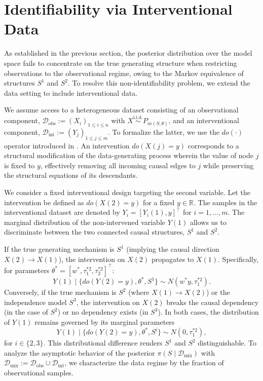 \documentclass[accepted]{uai2026} %
\newcommand{\train}{\mathcal{D}}
\newcommand{\obsdata}{\train_{\text{obs}}}
\newcommand{\mixdata}{\train_{\text{mix}}}
\newcommand{\tsone}{\tau_1^{*2}}
\newcommand{\tstwo}{\tau_2^{*2}}
\newcommand{\intdata}{\train_{\text{int}}}
\def\transpose{\intercal}
\theoremstyle{boldremark}
\begin{document}
\section{Identifiability via Interventional Data}
\label{sec:ident}
As established in the previous section, the posterior distribution over the model space fails to concentrate on the true generating structure when restricting observations to the observational regime, owing to the Markov equivalence of structures $S^1$ and $S^2$. To resolve this non-identifiability problem, we extend the data setting to include interventional data.

We assume access to a heterogeneous dataset consisting of an observational component, $\obsdata := (X_i)_{1\leq i \leq n} $ with $X\stackrel{\text{i.i.d.}}{\sim} P_{m(S,\theta)}$, and an interventional component, $\intdata := (Y_j)_{1\leq j \leq m}$. To formalize the latter, we use the $do(\cdot)$ operator introduced in \cite{pearl2009causality}. An intervention $do(X(j) = y)$ corresponds to a structural modification of the data-generating process wherein the value of node $j$ is fixed to $y$, effectively removing all incoming causal edges to $j$ while preserving the structural equations of its descendants.

We consider a fixed interventional design targeting the second variable. Let the intervention be defined as $do(X(2) = y)$ for a fixed $y \in \mathbb{R}$. The samples in the interventional dataset are denoted by $Y_i = [Y_i(1), y]^\transpose$ for $i = 1, \dots, m$. The marginal distribution of the non-intervened variable $Y(1)$ allows us to discriminate between the two connected causal structures,  $S^1$ and $S^2$.

If the true generating mechanism is $S^1$ (implying the causal direction $X(2) \to X(1)$), the intervention on $X(2)$ propagates to $X(1)$. Specifically, for parameters $\theta^* = [w^*, \tsone, \tstwo]^\transpose$:
\begin{equation}
    Y(1) \mid \{ do(Y(2) = y), \theta^*, S^1\} \sim N(w^*y, \tsone).
\end{equation}
Conversely, if the true mechanism is $S^2$ (where $X(1) \to X(2)$) or the independence model $S^3$, the intervention on $X(2)$ breaks the causal dependency (in the case of $S^2$) or no dependency exists (in $S^3$). In both cases, the distribution of $Y(1)$ remains governed by its marginal parameters
\begin{equation}
    Y(1) \mid \{do(Y(2) = y), \theta^*,  S^i\} \sim N(0, \tsone),
\end{equation}
for $i \in \{2, 3\}$. This distributional difference renders $S^1$ and $S^2$ distinguishable. To analyze the asymptotic behavior of the posterior $\pi(S \mid \mixdata)$ with $\mixdata :=\obsdata\cup\intdata$, we characterize the data regime by the fraction of observational samples.
\end{document}
